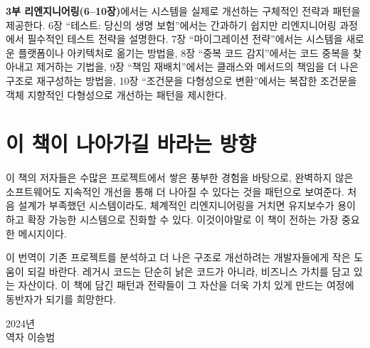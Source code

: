 \documentclass[a4paper,10pt,twoside]{book}
\begin{document}
\textbf{3부 리엔지니어링(6--10장)}에서는 시스템을 실제로 개선하는 구체적인 전략과 패턴을 제공한다.
6장 ``테스트: 당신의 생명 보험''에서는 간과하기 쉽지만 리엔지니어링 과정에서 필수적인 테스트 전략을 설명한다.
7장 ``마이그레이션 전략''에서는 시스템을 새로운 플랫폼이나 아키텍처로 옮기는 방법을,
8장 ``중복 코드 감지''에서는 코드 중복을 찾아내고 제거하는 기법을,
9장 ``책임 재배치''에서는 클래스와 메서드의 책임을 더 나은 구조로 재구성하는 방법을,
10장 ``조건문을 다형성으로 변환''에서는 복잡한 조건문을 객체 지향적인 다형성으로 개선하는 패턴을 제시한다.

\section*{이 책이 나아가길 바라는 방향}

이 책의 저자들은 수많은 프로젝트에서 쌓은 풍부한 경험을 바탕으로,
완벽하지 않은 소프트웨어도 지속적인 개선을 통해 더 나아질 수 있다는 것을 패턴으로 보여준다.
처음 설계가 부족했던 시스템이라도, 체계적인 리엔지니어링을 거치면
유지보수가 용이하고 확장 가능한 시스템으로 진화할 수 있다.
이것이야말로 이 책이 전하는 가장 중요한 메시지이다.

이 번역이 기존 프로젝트를 분석하고 더 나은 구조로 개선하려는 개발자들에게 작은 도움이 되길 바란다.
레거시 코드는 단순히 낡은 코드가 아니라, 비즈니스 가치를 담고 있는 자산이다.
이 책에 담긴 패턴과 전략들이 그 자산을 더욱 가치 있게 만드는 여정에 동반자가 되기를 희망한다.

\vspace{1cm}
\noindent
2024년\\
역자 이승범

\ifx\wholebook\relax\else
   
   
   
\end{document}
